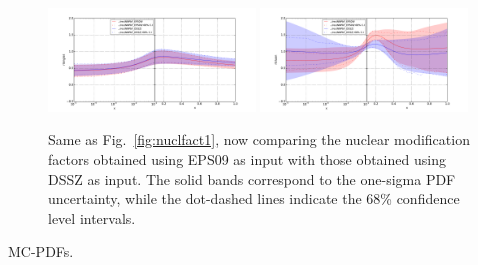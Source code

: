 \begin{figure}[t]
\begin{center}
 \includegraphics[width=0.49\textwidth]{plots/pdfcompSinglet-final2.pdf}
  \includegraphics[width=0.49\textwidth]{plots/pdfcompGluon-final2.pdf}
 \end{center}
\vspace{-0.3cm}
\caption{\small Same as Fig.~\ref{fig:nuclfact1}, now comparing
  the nuclear modification factors obtained using EPS09 as input
  with those obtained using DSSZ as input.
  The solid bands correspond to the one-sigma
  PDF uncertainty, while the dot-dashed lines
  indicate the 68\% confidence level intervals.
}
\label{fig:nuclfact2}
\end{figure}


MC-PDFs.
